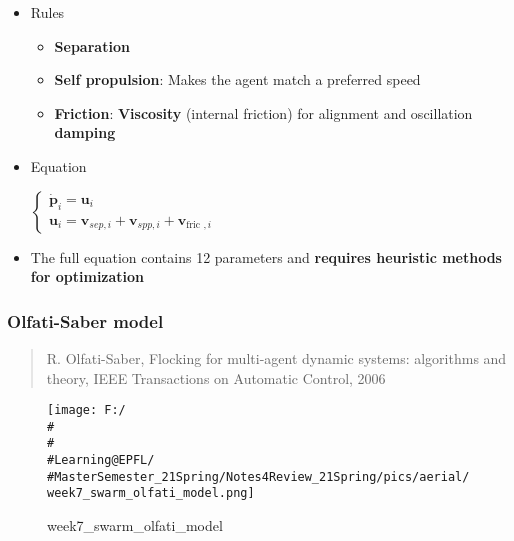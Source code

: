 \documentclass[]{article}
\begin{document}
\begin{itemize}
\item
  Rules

  \begin{itemize}
  \item
    \textbf{Separation}
  \item
    \textbf{Self propulsion}: Makes the agent match a preferred speed
  \item
    \textbf{Friction}: \textbf{Viscosity} (internal friction) for
    alignment and oscillation \textbf{damping}
  \end{itemize}
\item
  Equation

  \(\left\{\begin{array}{l}\dot{\boldsymbol{p}}_{i}=\boldsymbol{u}_{i} \\ \boldsymbol{u}_{i}=\boldsymbol{v}_{s e p, i}+\boldsymbol{v}_{s p p, i}+\boldsymbol{v}_{\text {fric }, i}\end{array}\right.\)
\item
  The full equation contains 12 parameters and \textbf{requires
  heuristic methods for optimization}
\end{itemize}

\subsubsection{Olfati-Saber model}\label{header-n1381}

\begin{quote}
R. Olfati-Saber, Flocking for multi-agent dynamic systems: algorithms
and theory, IEEE Transactions on Automatic Control, 2006
\end{quote}

\begin{figure}
\centering
\texttt{[image: F:/\\\#\\\#\\\#Learning@EPFL/\\\#MasterSemester\_21Spring/Notes4Review\_21Spring/pics/aerial/week7\_swarm\_olfati\_model.png]}
\caption{week7\_swarm\_olfati\_model}
\end{figure}
\end{document}
